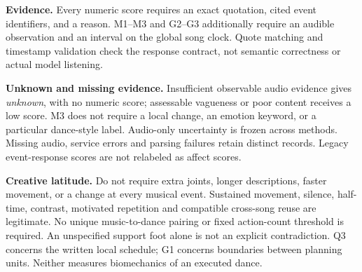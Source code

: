 \begin{table}[!htbp]
\begin{minipage}{\textwidth}
\par\smallskip
\textbf{Evidence.} Every numeric score requires an exact quotation, cited event identifiers, and a reason. M1--M3 and G2--G3 additionally require an audible observation and an interval on the global song clock. Quote matching and timestamp validation check the response contract, not semantic correctness or actual model listening.
\par\smallskip
\textbf{Unknown and missing evidence.} Insufficient observable audio evidence gives \emph{unknown}, with no numeric score; assessable vagueness or poor content receives a low score. M3 does not require a local change, an emotion keyword, or a particular dance-style label. Audio-only uncertainty is frozen across methods. Missing audio, service errors and parsing failures retain distinct records. Legacy event-response scores are not relabeled as affect scores.
\par\smallskip
\textbf{Creative latitude.} Do not require extra joints, longer descriptions, faster movement, or a change at every musical event. Sustained movement, silence, half-time, contrast, motivated repetition and compatible cross-song reuse are legitimate. No unique music-to-dance pairing or fixed action-count threshold is required. An unspecified support foot alone is not an explicit contradiction. Q3 concerns the written local schedule; G1 concerns boundaries between planning units. Neither measures biomechanics of an executed dance.
\end{minipage}
\endgroup
\end{table}
